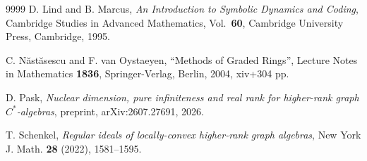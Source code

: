 \documentclass[a4paper,reqno,12pt]{amsart}
\numberwithin{equation}{section}
\theoremstyle{definition}
\theoremstyle{remark}
\begin{document}
\begin{thebibliography}{9999}
D. Lind and B. Marcus, \emph{An Introduction to Symbolic Dynamics and Coding}, Cambridge Studies in Advanced Mathematics, Vol.~\textbf{60}, Cambridge University Press, Cambridge, 1995.

C. N\u{a}st\u{a}sescu and F. van Oystaeyen, ``Methods of Graded Rings'', Lecture Notes in Mathematics \textbf{1836}, Springer-Verlag, Berlin, 2004, xiv+304 pp.

D. Pask, \emph{Nuclear dimension, pure infiniteness and real rank for higher-rank graph $C^*$-algebras}, preprint, arXiv:2607.27691, 2026.

T. Schenkel, \emph{Regular ideals of locally-convex higher-rank graph algebras}, New York J. Math. {\bf 28} (2022), 1581--1595.

\end{thebibliography}
\end{document}
